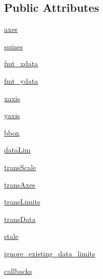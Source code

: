 \subsection*{Public Attributes}
\begin{DoxyCompactItemize}
\item 
\hyperlink{classmatplotlib_1_1axes_1_1__base_1_1__AxesBase_a84fd8632684752be722be4e78abd9495}{axes}
\item 
\hyperlink{classmatplotlib_1_1axes_1_1__base_1_1__AxesBase_afab93f734a26133709cd6c3f95577fcf}{spines}
\item 
\hyperlink{classmatplotlib_1_1axes_1_1__base_1_1__AxesBase_a208180d751ea2e97a034e24865009568}{fmt\+\_\+xdata}
\item 
\hyperlink{classmatplotlib_1_1axes_1_1__base_1_1__AxesBase_ab3a5e06ea833de9503b920f41d36347a}{fmt\+\_\+ydata}
\item 
\hyperlink{classmatplotlib_1_1axes_1_1__base_1_1__AxesBase_afbf523cdade2754fbd521f57040e3952}{xaxis}
\item 
\hyperlink{classmatplotlib_1_1axes_1_1__base_1_1__AxesBase_aef3c9f6c209c3a7652588ad9b3e057a0}{yaxis}
\item 
\hyperlink{classmatplotlib_1_1axes_1_1__base_1_1__AxesBase_a052ea9a0fd0d62b6dc976c490137d0d1}{bbox}
\item 
\hyperlink{classmatplotlib_1_1axes_1_1__base_1_1__AxesBase_ab98602227572163837fac3228445307b}{data\+Lim}
\item 
\hyperlink{classmatplotlib_1_1axes_1_1__base_1_1__AxesBase_a75317f84b0eacd707a85efab5ff2db36}{trans\+Scale}
\item 
\hyperlink{classmatplotlib_1_1axes_1_1__base_1_1__AxesBase_a27a291d947cdca58064d7a3adc10c0cd}{trans\+Axes}
\item 
\hyperlink{classmatplotlib_1_1axes_1_1__base_1_1__AxesBase_afca4b61b273f464efae8088105da8216}{trans\+Limits}
\item 
\hyperlink{classmatplotlib_1_1axes_1_1__base_1_1__AxesBase_a69bd10e3705f61e555d221ab99157afe}{trans\+Data}
\item 
\hyperlink{classmatplotlib_1_1axes_1_1__base_1_1__AxesBase_ac779b0bc9c0866c25b61e4335a31c3bf}{stale}
\item 
\hyperlink{classmatplotlib_1_1axes_1_1__base_1_1__AxesBase_a6318f36e8de9e7e69ec6e027db6fd8f4}{ignore\+\_\+existing\+\_\+data\+\_\+limits}
\item 
\hyperlink{classmatplotlib_1_1axes_1_1__base_1_1__AxesBase_aad860ba3aaf269e0b5af4de4e3e5ae61}{callbacks}
\item 

\end{DoxyCompactItemize}
